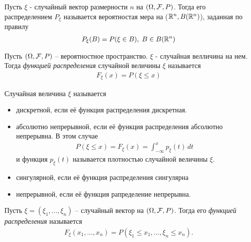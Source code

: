 \begin{definition}
  Пусть $\xi$ - случайный вектор размерности $n$ на $(\Omega, \mathcal{F}, P)$. 
  Тогда его распределением $P_\xi$ называется вероятностая мера на ($\mathbb{R}^n, B(\mathbb{R}^n)$), заданная по правилу
    \begin{align*}
      P_\xi (B) = P(\xi \in B),\; B \in B(\mathbb{R}^n)
    \end{align*}
\end{definition}


\begin{definition}
  Пусть $(\Omega, \mathcal{F}, P)$ -- вероятностное пространство.
  $\xi$ - случайная велличина на нем. Тогда \emph{функцией распределения} случайной величины $\xi$ называется
    \begin{align*}
      F_\xi (x) = P(\xi \leq x)
    \end{align*}
\end{definition}

\begin{definition}
  Случайная величина $\xi$ называется
  \begin{itemize}
    \item 
      дискретной, если её функция распределения дискретная.

    \item 
      абсолютно непрерывной, если её функция распределения абсолютно непрерывна. 
      В этом случае
      \begin{align*}
        P(\xi \leq x) = F_\xi (x) = \int_{-\infty}^{x} p_\xi (t)\, dt
      \end{align*}
      и функция $p_\xi (t)$ называется плотностью случайной величины $\xi$.\\

    \item
      сингулярной, если её функция распределения сингулярна

    \item
      непрерывной, если её функция рапределение непрерывна.
  \end{itemize}
\end{definition}

\begin{definition}
  Пусть $\xi = (\xi_1, \ldots, \xi_n)$ -- случайный вектор на $(\Omega, \mathcal{F}, P)$. 
  Тогда его \emph{функцией распределения} называется 
  \begin{align*}
    F_\xi (x_1, \ldots, x_n) = P(\xi_1 \leq x_1, \ldots, \xi_n \leq x_n).
  \end{align*}
\end{definition}


